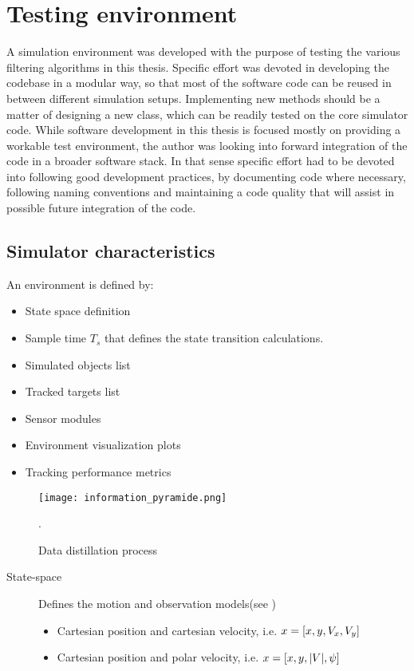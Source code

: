 
\chapter{Testing environment }

A simulation environment was developed with the purpose of testing the various filtering algorithms in this thesis. Specific effort was devoted in developing the codebase in a modular way, so that most of the software code can be reused in between different simulation setups. Implementing new methods should be a matter of designing a new class, which can be readily tested on the core simulator code. While software development in this thesis is focused mostly on providing a workable test environment, the author was looking into forward integration of the code in a broader software stack. In that sense specific effort had to be devoted into following good development practices, by documenting code where necessary, following naming conventions and maintaining a code quality that will assist in possible future integration of the code.


\section{Simulator characteristics}

An environment is defined by:
\begin{itemize}
	\item State space definition 
	\item Sample time $T_s$ that defines the state transition calculations.
	\item Simulated objects list
	\item Tracked targets list
	\item Sensor modules
	\item Environment visualization plots
	\item Tracking performance metrics
\end{itemize}


\begin{figure}[H]
	\centering
	\texttt{[image: information\_pyramide.png]}
	\caption{Data distillation process}.
	\label{fig:information_pyramide}
\end{figure}


\begin{description}
	\item[State-space] Defines the motion and observation models(see )
	\begin{itemize}
		\item Cartesian position and cartesian velocity, i.e. $ x=[x,y,{V}_x, {V}_y] $
		\item Cartesian position and polar velocity, i.e. $ x = [x,y,|{V}|,{\psi}	]$
	\end{itemize}
\end{description}

